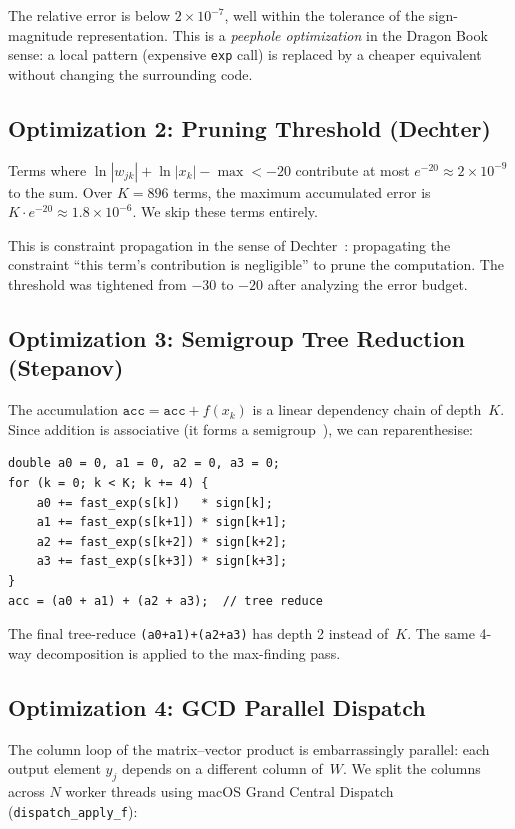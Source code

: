 \documentclass[acmsmall,nonacm]{acmart}
\begin{document}
The relative error is below $2 \times 10^{-7}$, well within the
tolerance of the sign-magnitude representation.  This is a
\emph{peephole optimization} in the Dragon Book sense: a local
pattern (expensive \texttt{exp} call) is replaced by a cheaper
equivalent without changing the surrounding code.

\subsection{Optimization 2: Pruning Threshold (Dechter)}

Terms where $\ln|w_{jk}| + \ln|x_k| - \max < -20$ contribute at most
$e^{-20} \approx 2 \times 10^{-9}$ to the sum.  Over $K = 896$
terms, the maximum accumulated error is $K \cdot e^{-20} \approx
1.8 \times 10^{-6}$.  We skip these terms entirely.

This is constraint propagation in the sense of
Dechter~\cite{dechter}: propagating the constraint ``this term's
contribution is negligible'' to prune the computation.  The
threshold was tightened from $-30$ to $-20$ after analyzing the
error budget.

\subsection{Optimization 3: Semigroup Tree Reduction (Stepanov)}

The accumulation $\texttt{acc} = \texttt{acc} + f(x_k)$ is a linear
dependency chain of depth~$K$.  Since addition is associative (it
forms a semigroup~\cite{stepanov2009}), we can reparenthesise:

\begin{lstlisting}[language=C89,caption={4-way ILP accumulation}]
double a0 = 0, a1 = 0, a2 = 0, a3 = 0;
for (k = 0; k < K; k += 4) {
    a0 += fast_exp(s[k])   * sign[k];
    a1 += fast_exp(s[k+1]) * sign[k+1];
    a2 += fast_exp(s[k+2]) * sign[k+2];
    a3 += fast_exp(s[k+3]) * sign[k+3];
}
acc = (a0 + a1) + (a2 + a3);  // tree reduce
\end{lstlisting}

The final tree-reduce \texttt{(a0+a1)+(a2+a3)} has depth 2 instead
of~$K$.  The same 4-way decomposition is applied to the max-finding
pass.

\subsection{Optimization 4: GCD Parallel Dispatch}

The column loop of the matrix--vector product is embarrassingly
parallel: each output element $y_j$ depends on a different column
of~$W$.  We split the columns across $N$ worker threads using macOS
Grand Central Dispatch (\texttt{dispatch\_apply\_f}):
\end{document}
